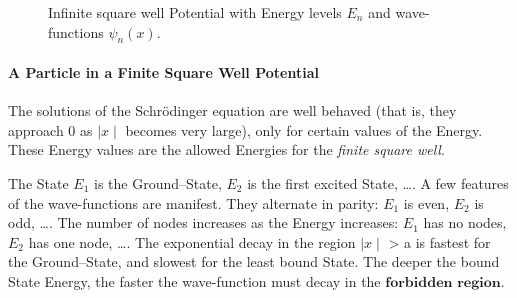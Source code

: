 \documentclass[a4paper, 10pt, onepage]{elegantbook}
\begin{document}
{\begin{figure}[h!]
\caption{Infinite square well Potential with Energy levels $E_n$ and wave-functions $\psi_n(x)$.}
\end{figure}

\paragraph{A Particle in a Finite Square Well Potential}

The solutions of the Schr\"odinger equation are well behaved (that is, they approach 0 as $\mid x \mid$ becomes 
very large), only for certain values of the Energy. These Energy values are the allowed Energies for the \emph{finite 
square well}.  

The State $E_1$ is the Ground--State, $E_2$ is the first excited State, \ldots. A few features of the wave-functions are 
manifest. They alternate in parity: $E_1$ is even, $E_2$ is odd, \ldots. The number of nodes increases as the Energy 
increases: $E_1$ has no nodes, $E_2$ has one node, \ldots. The exponential decay in the region $\mid x \mid$ > a is 
fastest for the Ground--State, and slowest for the least bound State. The deeper the bound State Energy, the faster the 
wave-function must decay in the $\mathbf{\textbf{forbidden region}}$.  




\begin{figure}[htbp]
\centering
{}
\end{figure}}
\end{document}
